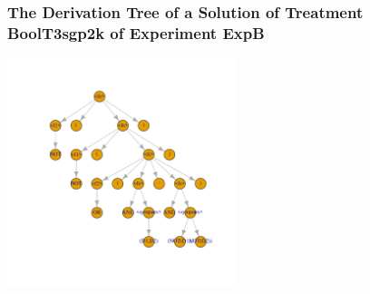  \begin{frame}
 \frametitle{ The Derivation Tree of a Solution of Treatment BoolT3sgp2k of Experiment ExpB }
 \begin{center}
\includegraphics[width=0.5\textwidth, angle=0]
{ExpBDerivationTreeFigure015.pdf}
 \end{center}
 \label{report/ExpBDerivationTreeFigure015.pdf}  
 \end{frame}

